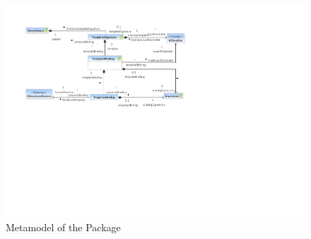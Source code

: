%
%

\begin{figure}[htb]
  \centering
  \includegraphics[width=\textwidth]{figures/A_technical-reference/packages/modeling_templates/sdm-templates}
  \caption{Metamodel of the  Package}
  \label{fig:MM:templates}
\end{figure}
